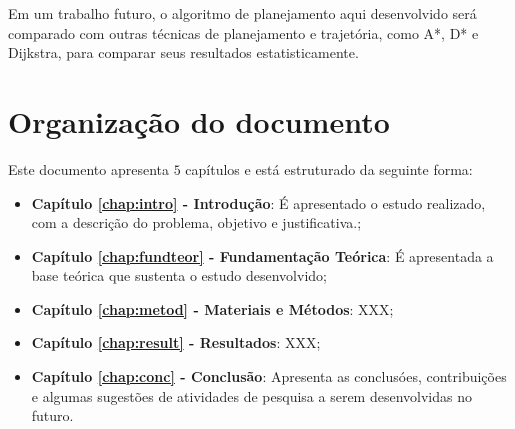 Em um trabalho futuro, o algoritmo de planejamento aqui desenvolvido será comparado com outras técnicas de planejamento e trajetória, como A*, D* e Dijkstra, para comparar seus resultados estatisticamente.

\section{Organização do documento}
\label{section:organizacao}

Este documento apresenta $5$ capítulos e está estruturado da seguinte forma:

\begin{itemize}

  \item \textbf{Capítulo \ref{chap:intro} - Introdução}: É apresentado o estudo realizado, com a descrição do problema, objetivo e justificativa.;
  \item \textbf{Capítulo \ref{chap:fundteor} - Fundamentação Teórica}: É apresentada a base teórica que sustenta o estudo desenvolvido;
  \item \textbf{Capítulo \ref{chap:metod} - Materiais e Métodos}: XXX;
  \item \textbf{Capítulo \ref{chap:result} - Resultados}: XXX;
  \item \textbf{Capítulo \ref{chap:conc} - Conclusão}: Apresenta as conclusóes, contribuições e algumas sugestões de atividades de pesquisa a serem desenvolvidas no futuro.

\end{itemize}
